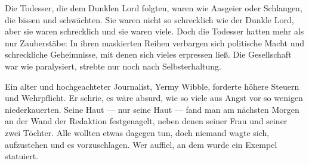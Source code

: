 Die Todesser, die dem Dunklen Lord folgten, waren wie Aasgeier oder Schlangen, die bissen und schwächten. Sie waren nicht so schrecklich wie der Dunkle Lord, aber sie waren schrecklich und sie waren viele. Doch die Todesser hatten mehr als nur Zauberstäbe: In ihren maskierten Reihen verbargen sich politische Macht und schreckliche Geheimnisse, mit denen sich vieles erpressen ließ. Die Gesellschaft war wie paralysiert, strebte nur noch nach Selbsterhaltung.

Ein alter und hochgeachteter Journalist, Yermy Wibble, forderte höhere Steuern und Wehrpflicht. Er schrie, es wäre absurd, wie so viele aus Angst vor so wenigen niederkauerten. Seine Haut — nur seine Haut — fand man am nächsten Morgen an der Wand der Redaktion festgenagelt, neben denen seiner Frau und seiner zwei Töchter. Alle wollten etwas dagegen tun, doch niemand wagte sich, aufzustehen und es vorzuschlagen. Wer auffiel, an dem wurde ein Exempel statuiert.

